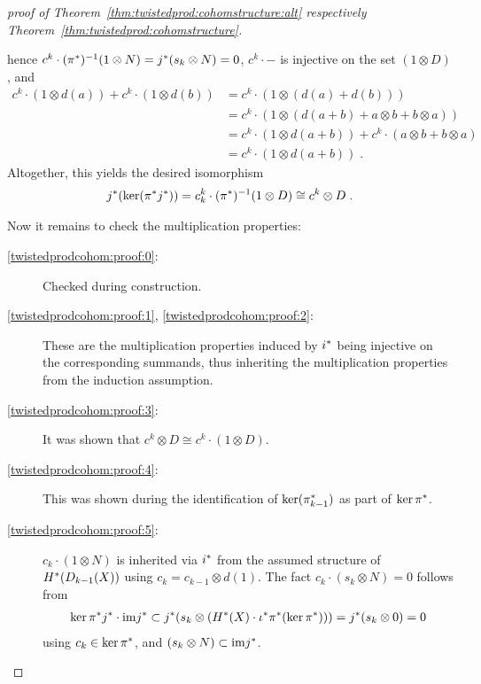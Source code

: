 \begin{proof}[proof of
  Theorem~\ref{thm:twistedprod:cohomstructure:alt}
  respectively Theorem~\ref{thm:twistedprod:cohomstructure}]
\begin{description}
    hence $c^k\cdot ({\pi}^*)^{-1}(1\otimes N) = {j}^*(s_k\otimes N)=0$,
    $c^k\cdot -$ is injective on the set $(1\otimes D)$, and
    \begin{align*}
      c^k\cdot(1\otimes d(a)) + c^k \cdot(1\otimes d(b))
      &= c^k\cdot \left( 1\otimes (d(a)+d(b)) \right) \\
      &= c^k\cdot \left( 1\otimes
        (d(a+b) + a\otimes b + b\otimes a)
        \right) \\
      &= c^k\cdot (1\otimes d(a+b)) + c^k\cdot(a\otimes b + b\otimes a)\\
      &= c^k\cdot (1\otimes d(a+b))
        \;.
    \end{align*}
    Altogether, this yields the desired isomorphism
    \begin{gather*}
      {j}^*(\ker({\pi}^*{j}^*))
      = c_k^k\cdot({\pi}^*)^{-1}(1\otimes D)\cong c^k\otimes D
      \;.
    \end{gather*}
  \end{description}
  Now it remains to check the multiplication properties:
  \begin{description}
  \item[\ref{twistedprodcohom:proof:0}:]
    Checked during construction.
  \item[\ref{twistedprodcohom:proof:1}, \ref{twistedprodcohom:proof:2}:]
    These are the multiplication properties induced by ${i}^*$ being
    injective on the corresponding summands, thus inheriting the
    multiplication properties from the induction assumption.
  \item[\ref{twistedprodcohom:proof:3}:]
    It was shown that $c^k\otimes D\cong c^k\cdot (1\otimes D)$.
  \item[\ref{twistedprodcohom:proof:4}:]
    This was shown during the identification of $\ker({\pi}^*_{k-1})$
    as part of $\ker{\pi}^*$.
  \item[\ref{twistedprodcohom:proof:5}:]
    $c_k\cdot(1\otimes N)$ is inherited via ${i}^*$ from the assumed
    structure of $H^*(D_{k-1}({X}))$ using
    $c_k = c_{k-1}\otimes d(1)$.
    The fact $c_k\cdot(s_k\otimes N)=0$ follows from
    \begin{gather*}
      \ker{\pi}^*{j}^*\cdot\mathrm{im}{j}^*
      \subset {j}^*(s_k\otimes(H^*(X)\cdot {\iota}^*{\pi}^*(\ker{\pi}^*)))
      = {j}^*(s_k\otimes 0) = 0
    \end{gather*}
    using $c_k\in\ker{\pi}^*$, and $(s_k\otimes N)\subset\mathrm{im}{j}^*$.
  \end{description}
  

\end{proof}
